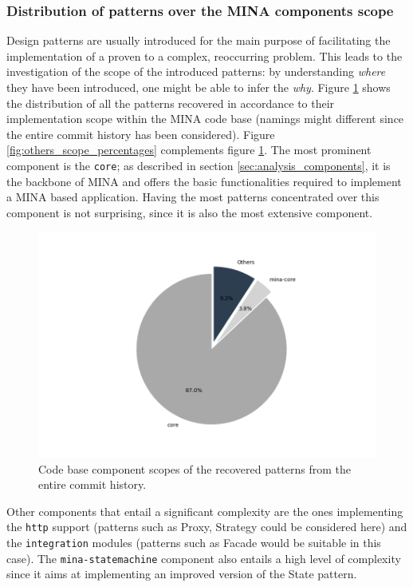 \subsubsection{Distribution of patterns over the MINA components scope}
\label{sec:scope_analysis}
Design patterns are usually introduced for the main purpose of facilitating the implementation of a proven to a complex, reoccurring problem. This leads to the investigation of the scope of the introduced patterns: by understanding \textit{where} they have been introduced, one might be able to infer the \textit{why}. Figure \ref{fig:scope_percentages} shows the distribution of all the patterns recovered in accordance to their implementation scope within the MINA code base (namings might different since the entire commit history has been considered). Figure \ref{fig:others_scope_percentages} complements figure \ref{fig:scope_percentages}. The most prominent component is the \texttt{core}; as described in section \ref{sec:analysis_components}, it is the backbone of MINA and offers the basic functionalities required to implement a MINA based application. Having the most patterns concentrated over this component is not surprising, since it is also the most extensive component.

\begin{figure}[H]
    \centering
    \includegraphics[width =\textwidth]{images/graphs/all_scopes_per.png}
    \caption{Code base component scopes of the recovered patterns from the entire commit history.}
    \label{fig:scope_percentages}
\end{figure}
Other components that entail a significant complexity are the ones implementing the \texttt{http} support (patterns such as Proxy, Strategy could be considered here)  and the \texttt{integration} modules (patterns such as Facade would be suitable in this case). The \texttt{mina-statemachine} component also entails a high level of complexity since it aims at implementing an improved version of the State pattern. 

